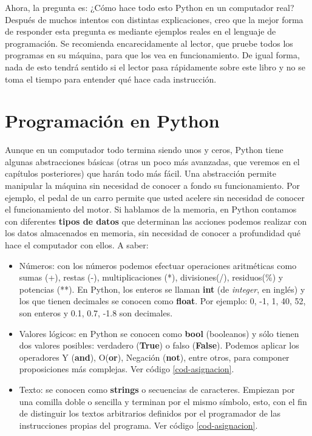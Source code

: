 Ahora, la pregunta es: ¿Cómo hace todo esto Python en un computador real? Después de muchos intentos con distintas explicaciones, creo que la mejor forma de responder esta pregunta es mediante ejemplos reales en el lenguaje de programación. Se recomienda encarecidamente al lector, que pruebe todos los programas en su máquina, para que los vea en funcionamiento. De igual forma, nada de esto tendrá sentido si el lector pasa rápidamente sobre este libro y no se toma el tiempo para entender qué hace cada instrucción.

\section{Programación en Python}

Aunque en un computador todo termina siendo unos y ceros, Python tiene algunas abstracciones básicas (otras un poco más avanzadas, que veremos en el capítulos posteriores) que harán todo más fácil. Una abstracción permite manipular la máquina sin necesidad de conocer a fondo su funcionamiento. Por ejemplo, el pedal de un carro permite que usted acelere sin necesidad de conocer el funcionamiento del motor. Si hablamos de la memoria, en Python contamos con diferentes \textbf{tipos de datos} que determinan las acciones podemos realizar con los datos almacenados en memoria, sin necesidad de conocer a profundidad qué hace el computador con ellos. A saber:

\begin{itemize}
\item Números: con los números podemos efectuar operaciones aritméticas como sumas (+), restas (-), multiplicaciones (*), divisiones(/), residuos(\%) y potencias (**). En Python, los enteros se llaman \textbf{int} (de \emph{integer}, en inglés) y los que tienen decimales se conocen como \textbf{float}. Por ejemplo: 0, -1, 1, 40, 52, son enteros y 0.1, 0.7, -1.8 son decimales.

\item Valores lógicos: en Python se conocen como \textbf{bool} (booleanos) y sólo tienen dos valores posibles: verdadero (\textbf{True}) o falso (\textbf{False}). Podemos aplicar los operadores Y (\textbf{and}), O(\textbf{or}), Negación (\textbf{not}), entre otros, para componer proposiciones más complejas.  Ver código \ref{cod-asignacion}.

\item Texto: se conocen como \textbf{strings} o secuencias de caracteres. Empiezan por una comilla doble o sencilla y terminan por el mismo símbolo, esto, con el fin de distinguir los textos arbitrarios definidos por el programador de las instrucciones propias del programa. Ver código \ref{cod-asignacion}.
\end{itemize}

